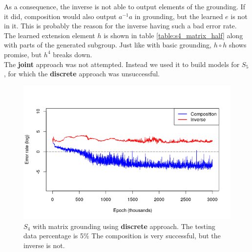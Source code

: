 As a consequence, the inverse is not able to output elements of the grounding. If it did, composition would also output $a^{-1}a$ in grounding, but the learned $e$ is not in it. This is probably the reason for the inverse having such a bad error rate.\\

The learned extension element $h$ is shown in table \ref{table:s4_matrix_half} along with parts of the generated subgroup. Just like with basic grounding, $h\circ h$ shows promise, but $h^4$ breaks down.\\


The \textbf{joint} approach was not attempted. Instead we used it to build models for $S_5$, for which the \textbf{discrete} approach was unsuccessful.

\begin{figure}
\center
\caption{$S_4$ with matrix grounding using \textbf{discrete} approach. The testing data percentage is 5\% The composition is very successful, but the inverse is not.}
\label{graph:s4_matrix}
\includegraphics[width=\linewidth]{../img/s4_matrix.png}
\end{figure}

